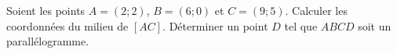 
\begin{exercice}\label{exoSeconde-0011}

    Soient les points \( A=(2;2)\), \( B=(6;0)\) et \( C=(9;5)\). Calculer les coordonnées du milieu de \( [AC]\). Déterminer un point \( D\) tel que \( ABCD\) soit un parallélogramme.

\end{exercice}
